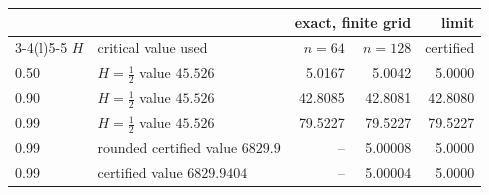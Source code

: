 \begin{tabular}{@{}llrrr@{}}\toprule
& & \multicolumn{2}{c}{exact, finite grid} & limit\\\cmidrule(lr){3-4}\cmidrule(l){5-5}
$H$ & critical value used & $n=64$ & $n=128$ & certified\\\midrule
0.50 & $H=\frac12$ value $45.526$ & 5.0167 & 5.0042 & 5.0000\\
0.90 & $H=\frac12$ value $45.526$ & 42.8085 & 42.8081 & 42.8080\\
0.99 & $H=\frac12$ value $45.526$ & 79.5227 & 79.5227 & 79.5227\\
0.99 & rounded certified value $6829.9$ & -- & 5.00008 & 5.0000\\
0.99 & certified value $6829.9404$ & -- & 5.00004 & 5.0000\\
\bottomrule\end{tabular}
